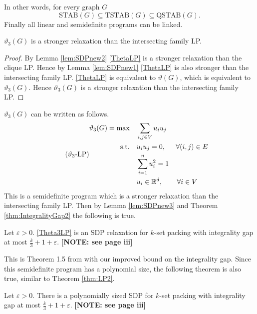 %
In other words, for every graph $G$
%
\begin{equation*}%
\textrm{STAB}(G) \subseteq \textrm{TSTAB}(G) \subseteq \textrm{QSTAB}(G).
\end{equation*}
%
Finally all linear and semidefinite programs can be linked.
%
\begin{lemma}\label{lem:SDPnew3}
$\vartheta_3(G)$ is a stronger relaxation than the intersecting family LP.
\end{lemma}
%
\begin{proof}
By Lemma \ref{lem:SDPnew2} \eqref{ThetaLP} is a stronger relaxation than the clique LP. Hence by Lemma \ref{lem:SDPnew1} \eqref{ThetaLP} is also stronger than the intersecting family LP. \eqref{ThetaLP} is equivalent to $\vartheta(G)$, which is equivalent to $\vartheta_3(G)$. Hence $\vartheta_3(G)$ is a stronger relaxation than the intersecting family LP.
\end{proof}
%
$\vartheta_3(G)$ can be written as follows.
%
\begin{equation}\tag{$\vartheta_3$-LP}
\label{Theta3LP}
\begin{alignedat}{2}
\vartheta_3(G) = \text{max}  \quad & \sum_{i,j \in V} u_i u_j \ \\
                 \text{s.t.} \quad & u_i u_j = 0,             & \quad \forall (i,j) \in E \\
                                   & \sum_{i=1}^n u_i^2 = 1   \\
                                   & u_i \in \mathbb{R}^d,    & \forall i \in V \quad \verb" "
\end{alignedat}
\end{equation}
%
This is a semidefinite program which is a stronger relaxation than the intersecting family LP. Then by Lemma \ref{lem:SDPnew3} and Theorem \ref{thm:IntegralityGap2} the following is true.
%
\begin{theorem}\label{thm:SDP2}
Let $\varepsilon > 0$. \eqref{Theta3LP} is an SDP relaxation for $k$-set packing with integrality gap at most $\frac{k}{3} + 1 + \varepsilon$. \textbf{[NOTE: see page iii]}
\end{theorem}
%
This is Theorem 1.5 from \cite{LapChiLau} with our improved bound on the integrality gap. Since this semidefinite program has a polynomial size, the following theorem is also true, similar to Theorem \ref{thm:LP2}.
%
\begin{theorem}\label{thm:SDP3}
Let $\varepsilon > 0$. There is a polynomially sized SDP for $k$-set packing with integrality gap at most $\frac{k}{3} + 1 + \varepsilon$. \textbf{[NOTE: see page iii]}
\end{theorem}

